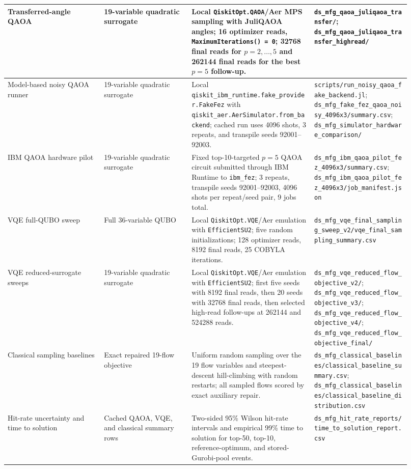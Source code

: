 \begin{table}[t]
\begin{tabular}{p{0.22\linewidth}p{0.20\linewidth}p{0.28\linewidth}p{0.22\linewidth}}
\hline
Transferred-angle QAOA & 19-variable quadratic surrogate &
Local \texttt{QiskitOpt.QAOA}/Aer MPS sampling with JuliQAOA angles; 16
optimizer reads, \texttt{MaximumIterations() = 0}; 32768 final reads for
$p=2,\ldots,5$ and 262144 final reads for the best $p=5$ follow-up. &
\texttt{ds\_mfg\_qaoa\_juliqaoa\_transfer/};
\texttt{ds\_mfg\_qaoa\_juliqaoa\_transfer\_highread/} \\
\hline
Model-based noisy QAOA runner & 19-variable quadratic surrogate &
Local \texttt{qiskit\_ibm\_runtime.fake\_provider.FakeFez} with
\texttt{qiskit\_aer.AerSimulator.from\_backend}; cached run uses 4096 shots,
3 repeats, and transpile seeds 92001--92003. &
\texttt{scripts/run\_noisy\_qaoa\_fake\_backend.jl};
\texttt{ds\_mfg\_fake\_fez\_qaoa\_noisy\_4096x3/summary.csv};
\texttt{ds\_mfg\_simulator\_hardware\_comparison/} \\
\hline
IBM QAOA hardware pilot & 19-variable quadratic surrogate &
Fixed top-10-targeted $p=5$ QAOA circuit submitted through IBM Runtime to
\texttt{ibm\_fez}; 3 repeats, transpile seeds 92001--92003, 4096 shots per
repeat/seed pair, 9 jobs total. &
\texttt{ds\_mfg\_ibm\_qaoa\_pilot\_fez\_4096x3/summary.csv};
\texttt{ds\_mfg\_ibm\_qaoa\_pilot\_fez\_4096x3/job\_manifest.json} \\
\hline
VQE full-QUBO sweep & Full 36-variable QUBO &
Local \texttt{QiskitOpt.VQE}/Aer emulation with \texttt{EfficientSU2}; five
random initializations; 128 optimizer reads, 8192 final reads, 25 COBYLA
iterations. &
\texttt{ds\_mfg\_vqe\_final\_sampling\_sweep\_v2/vqe\_final\_sampling\_summary.csv} \\
\hline
VQE reduced-surrogate sweeps & 19-variable quadratic surrogate &
Local \texttt{QiskitOpt.VQE}/Aer emulation with \texttt{EfficientSU2}; first
five seeds with 8192 final reads, then 20 seeds with 32768 final reads, then
selected high-read follow-ups at 262144 and 524288 reads. &
\texttt{ds\_mfg\_vqe\_reduced\_flow\_objective\_v2/};
\texttt{ds\_mfg\_vqe\_reduced\_flow\_objective\_v3/};
\texttt{ds\_mfg\_vqe\_reduced\_flow\_objective\_v4/};
\texttt{ds\_mfg\_vqe\_reduced\_flow\_objective\_final/} \\
\hline
Classical sampling baselines & Exact repaired 19-flow objective &
Uniform random sampling over the 19 flow variables and steepest-descent
hill-climbing with random restarts; all sampled flows scored by exact auxiliary
repair. &
\texttt{ds\_mfg\_classical\_baselines/classical\_baseline\_summary.csv};
\texttt{ds\_mfg\_classical\_baselines/classical\_baseline\_distribution.csv} \\
\hline
Hit-rate uncertainty and time to solution & Cached QAOA, VQE, and classical
summary rows &
Two-sided 95\% Wilson hit-rate intervals and empirical 99\% time to solution
for top-50, top-10, reference-optimum, and stored-Gurobi-pool events. &
\texttt{ds\_mfg\_hit\_rate\_reports/time\_to\_solution\_report.csv} \\
\hline
\end{tabular}
\end{table}

